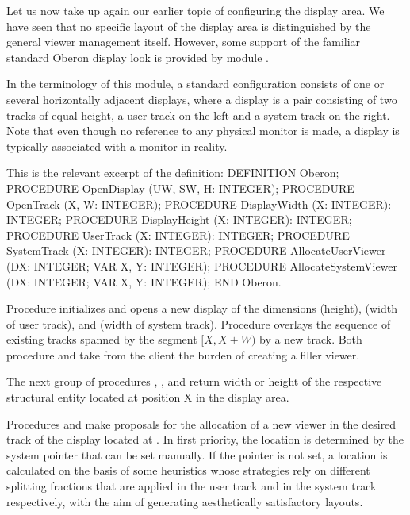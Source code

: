 Let us now take up again our earlier topic of configuring the display
area. We have seen that no specific layout of the display area is
distinguished by the general viewer management itself. However, some
support of the familiar standard Oberon display look is provided by
module .

In the terminology of this module, a standard configuration consists
of one or several horizontally adjacent displays, where a display is a
pair consisting of two tracks of equal height, a user track on the
left and a system track on the right. Note that even though no
reference to any physical monitor is made, a display is typically
associated with a monitor in reality.

This is the relevant excerpt of the definition:
\begintt
DEFINITION Oberon;
  PROCEDURE OpenDisplay (UW, SW, H: INTEGER);
  PROCEDURE OpenTrack (X, W: INTEGER);
  PROCEDURE DisplayWidth (X: INTEGER): INTEGER;
  PROCEDURE DisplayHeight (X: INTEGER): INTEGER;
  PROCEDURE UserTrack (X: INTEGER): INTEGER;
  PROCEDURE SystemTrack (X: INTEGER): INTEGER;
  PROCEDURE AllocateUserViewer (DX: INTEGER; VAR X, Y: INTEGER);
  PROCEDURE AllocateSystemViewer (DX: INTEGER; VAR X, Y: INTEGER);
END Oberon.
\endtt

\noindent Procedure  initializes and opens a new display of the
dimensions  (height),  (width of user track), and  (width of
system track). Procedure  overlays the sequence of existing
tracks spanned by the segment $[X, X + W)$ by a new track. Both
procedure  and  take from the client the burden
of creating a filler viewer.

The next group of procedures , ,
 and  return
width or height of the respective structural entity located at
position X in the display area.

Procedures  and  make proposals
for the allocation of a new viewer in the desired track of the display
located at . In first priority, the location is determined by the
system pointer that can be set manually. If the pointer is not set, a
location is calculated on the basis of some heuristics whose
strategies rely on different splitting fractions that are applied in
the user track and in the system track respectively, with the aim of
generating aesthetically satisfactory layouts.

